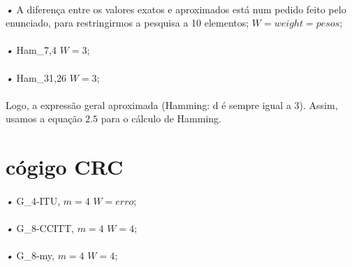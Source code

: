 \documentclass[13pt,a4paper]{report}
\begin{document}
\paragraph{}
\emph{•} A diferença entre os valores exatos e aproximados está num pedido feito pelo enunciado, para restringirmos a pesquisa a 10 elementos; $W = weight = pesos$;

\paragraph{}
\paragraph{}
\emph{•} Ham_{7,4} \rightarrow $W = 3$;
\paragraph{}
\emph{•} Ham_{31,26} \rightarrow $W = 3$;

\paragraph{}
Logo, a expressão geral aproximada (Hamming: d é sempre igual a 3). Assim, usamos a equação $2.5$ para o cálculo de Hamming.

\paragraph{}
\section{cógigo CRC}

\paragraph{}
\emph{•} G_{4-ITU}, $m=4$ \rightarrow $W = erro$; %
\paragraph{}
\emph{•} G_{8-CCITT}, $m=4$ \rightarrow $W = 4$; %
\paragraph{}
\emph{•} G_{8-my}, $m=4$ \rightarrow $W = 4$; %

\paragraph{}
\end{document}

